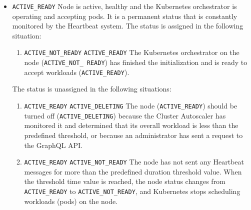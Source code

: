 \begin{itemize}
\begin{itemize}
      \item \texttt{ACTIVE\_READY}
        \newline
        Node is active, healthy and the Kubernetes orchestrator is operating and
        accepting pods.
        \newline
        It is a permanent status that is constantly monitored by the Heartbeat
        system.
        \newline
        The status is assigned in the following situation:
        \begin{enumerate}
          \item \texttt{ACTIVE\_NOT\_READY}  \texttt{ACTIVE\_READY}
            \newline
            The Kubernetes orchestrator on the node (\texttt{ACTIVE\_NOT\_ READY})
            has finished the initialization and is ready to accept workloads (\texttt{ACTIVE\_READY}).
        \end{enumerate}
        The status is unassigned in the following situations:
        \begin{enumerate}
          \item \texttt{ACTIVE\_READY}  \texttt{ACTIVE\_DELETING}
            \newline
            The node (\texttt{ACTIVE\_READY}) should be turned off (\texttt{ACTIVE\_DELETING})
            because the Cluster Autoscaler has monitored it and determined that
            its overall workload is less than the predefined threshold, or because
            an administrator has sent a request to the GraphQL API.

          \item \texttt{ACTIVE\_READY}  \texttt{ACTIVE\_NOT\_READY}
            \newline
            The node has not sent any Heartbeat messages for more than the
            predefined duration threshold value. When the threshold time value is
            reached, the node status changes from \texttt{ACTIVE\_READY} to \texttt{ACTIVE\_NOT\_READY},
            and Kubernetes stops scheduling workloads (pods) on the node.
        \end{enumerate}


\end{itemize}
\end{itemize}
